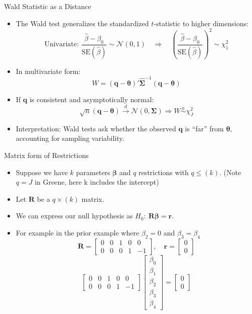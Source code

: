 \documentclass[aspectratio=169, handout, t]{beamer}
\numberwithin{equation}{section}
\begin{document}

\begin{frame}{Wald Statistic as a Distance}
\begin{itemize}
\item The Wald test generalizes the standardized $t$-statistic to higher dimensions:
\[
\text{Univariate: } \frac{\hat{\beta} - \beta_0}{\text{SE}(\hat{\beta})} \sim \mathcal{N}(0,1)
\quad \Rightarrow \quad \left( \frac{\hat{\beta} - \beta_0}{\text{SE}(\hat{\beta})} \right)^2 \sim \chi^2_1
\]
\item In multivariate form:
\[
W = (\bm{q} - \bm{\theta})' \bm{\hat{\Sigma}}^{-1} (\bm{q} - \bm{\theta})
\]
\item If $\bm{q}$ is consistent and asymptotically normal:
\[
\sqrt{n}(\bm{q} - \bm{\theta}) \overset{d}{\to} \mathcal{N}(0, \bm{\Sigma}) \Rightarrow W \overset{a}{\sim} \chi^2_J
\]
\item Interpretation: Wald tests ask whether the observed $\bm{q}$ is ``far'' from $\bm{\theta}$, accounting for sampling variability.
\end{itemize}
\end{frame}


\begin{frame}{Matrix form of Restrictions}
\begin{itemize}
\item Suppose we have $k$ parameters $\bm{\beta}$ and $q$ restrictions with $q\leq (k)$. (Note $q=J$ in Greene, here k includes the intercept)
\item Let $\bm{R}$ be a $q\times(k)$ matrix.
\item We can express our null hypothesis as $H_0:\ \bm{R\beta}=\bm{r}$.
\item For example in the prior example where $\beta_2=0$ and $\beta_3=\beta_4$\\
$$\bm{R}=\begin{bmatrix} 0& 0&1& 0&0\\ 0&0& 0& 1&-1\end{bmatrix},\quad \bm{r}=\begin{bmatrix} 0\\0\end{bmatrix}$$
$$\begin{bmatrix} 0&0& 1& 0&0\\0& 0& 0& 1&-1\end{bmatrix} \begin{bmatrix} \beta_0\\\beta_1\\\beta_2\\\beta_3\\\beta_4 \end{bmatrix}=\begin{bmatrix} 0\\0\end{bmatrix}$$
\end{itemize}
\end{frame}
\end{document}
